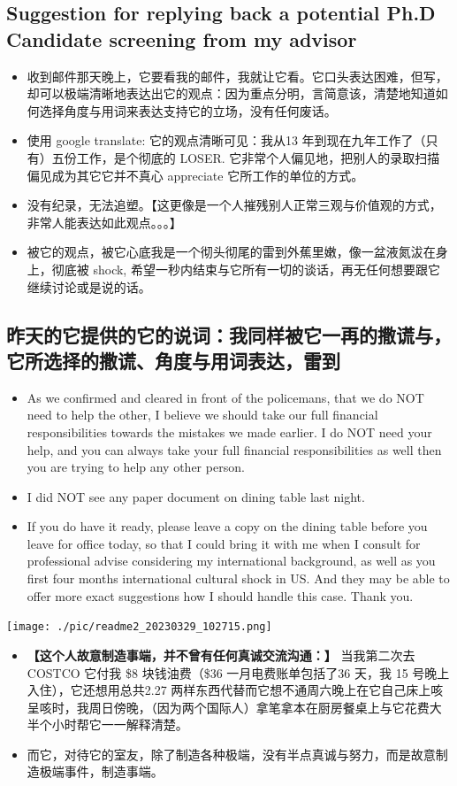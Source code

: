 \documentclass[9pt, b5paper]{article}
\begin{document}
\subsection{Suggestion for replying back a potential Ph.D Candidate screening from my advisor}
\label{sec-6-2}
\begin{itemize}
\item 收到邮件那天晚上，它要看我的邮件，我就让它看。它口头表达困难，但写，却可以极端清晰地表达出它的观点：因为重点分明，言简意该，清楚地知道如何选择角度与用词来表达支持它的立场，没有任何废话。
\item 使用 google translate: 它的观点清晰可见：我从13 年到现在九年工作了（只有）五份工作，是个彻底的 LOSER. 它非常个人偏见地，把别人的录取扫描偏见成为其它它并不真心 appreciate 它所工作的单位的方式。
\item 没有纪录，无法追塑。【这更像是一个人摧残别人正常三观与价值观的方式，非常人能表达如此观点。。。】
\item 被它的观点，被它心底我是一个彻头彻尾的雷到外蕉里嫩，像一盆液氮沷在身上，彻底被 shock, 希望一秒内结束与它所有一切的谈话，再无任何想要跟它继续讨论或是说的话。
\end{itemize}
\subsection{昨天的它提供的它的说词：我同样被它一再的撒谎与，它所选择的撒谎、角度与用词表达，雷到}
\label{sec-6-3}
\begin{itemize}
\item As we confirmed and cleared in front of the policemans, that we do NOT need to help the other, I believe we should take our full financial responsibilities towards the mistakes we made earlier. I do NOT need your help, and you can always take your full financial responsibilities as well then you are trying to help any other person.
\item I did NOT see any paper document on dining table last night.
\item If you do have it ready, please leave a copy on the dining table before you leave for office today, so that I could bring it with me when I consult for professional advise considering my international background, as well as you first four months international cultural shock in US. And they may be able to offer more exact suggestions how I should handle this case. Thank you.
\end{itemize}

\texttt{[image: ./pic/readme2\_20230329\_102715.png]}
\begin{itemize}
\item \textbf{【这个人故意制造事端，并不曾有任何真诚交流沟通：】} 当我第二次去COSTCO 它付我 \$8 块钱油费（\$36 一月电费账单包括了36 天，我 15 号晚上入住），它还想用总共2.27 两样东西代替而它想不通周六晚上在它自己床上咳呈咳时，我周日傍晚，（因为两个国际人）拿笔拿本在厨房餐桌上与它花费大半个小时帮它一一解释清楚。
\item 而它，对待它的室友，除了制造各种极端，没有半点真诚与努力，而是故意制造极端事件，制造事端。
\end{itemize}
\end{document}
